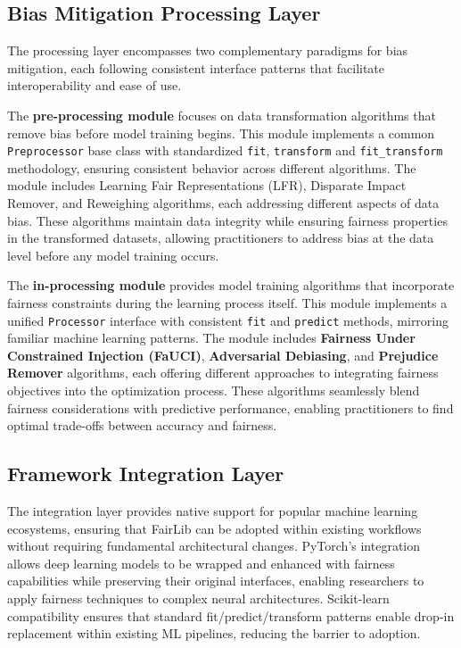 \documentclass[12pt,a4paper,openright,twoside]{book}
\begin{document}
\subsection{Bias Mitigation Processing Layer}

The processing layer encompasses two complementary paradigms for bias mitigation, each following consistent interface patterns that facilitate interoperability and ease of use.

The \textbf{pre-processing module} focuses on data transformation algorithms that remove bias before model training begins. This module implements a common \texttt{Preprocessor} base class with standardized \texttt{fit}, \texttt{transform} and \texttt{fit\_transform} methodology, ensuring consistent behavior across different algorithms. The module includes Learning Fair Representations (LFR), Disparate Impact Remover, and Reweighing algorithms, each addressing different aspects of data bias. These algorithms maintain data integrity while ensuring fairness properties in the transformed datasets, allowing practitioners to address bias at the data level before any model training occurs.

The \textbf{in-processing module} provides model training algorithms that incorporate fairness constraints during the learning process itself. This module implements a unified \texttt{Processor} interface with consistent \texttt{fit} and \texttt{predict} methods, mirroring familiar machine learning patterns. The module includes \textbf{Fairness Under Constrained Injection (FaUCI)}, \textbf{Adversarial Debiasing}, and \textbf{Prejudice Remover} algorithms, each offering different approaches to integrating fairness objectives into the optimization process. These algorithms seamlessly blend fairness considerations with predictive performance, enabling practitioners to find optimal trade-offs between accuracy and fairness.

\subsection{Framework Integration Layer}

The integration layer provides native support for popular machine learning ecosystems, ensuring that FairLib can be adopted within existing workflows without requiring fundamental architectural changes. PyTorch's integration allows deep learning models to be wrapped and enhanced with fairness capabilities while preserving their original interfaces, enabling researchers to apply fairness techniques to complex neural architectures. Scikit-learn compatibility ensures that standard fit/predict/transform patterns enable drop-in replacement within existing ML pipelines, reducing the barrier to adoption.
\end{document}
